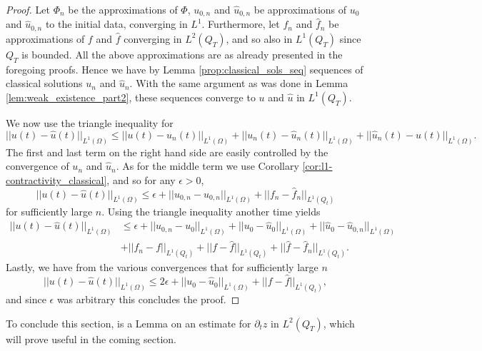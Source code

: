 \documentclass[11pt, a4paper]{article}
\begin{document}
\begin{proof}
Let $\Phi_n$ be the approximations of $\Phi$, $u_{0,n}$ and $\hat{u}_{0,n}$ be approximations of $u_0$ and $\hat{u}_{0,n}$ to the initial data, converging in $L^1$. Furthermore, let $f_n$ and $\hat{f}_n$ be approximations of $f$ and $\hat{f}$ converging in $L^2(Q_T)$, and so also in $L^1(Q_T)$ since $Q_T$ is bounded. All the above approximations are as already presented in the foregoing proofs. Hence we have by Lemma \ref{prop:classical_sols_seq} sequences of classical solutions $u_n$ and $\hat{u}_n$. With the same argument as was done in Lemma \ref{lem:weak_existence_part2}, these sequences converge to $u$ and $\hat{u}$ in $L^1(Q_T)$.

We now use the triangle inequality for
\begin{equation*}
||u(t) - \hat{u}(t)||_{L^1(\Omega)} \leq ||u(t) - u_n(t)||_{L^1(\Omega)} + ||u_n(t) - \hat{u}_n(t)||_{L^1(\Omega)} + ||\hat{u}_n(t) - \hat{u}(t)||_{L^1(\Omega)}.
\end{equation*}
The first and last term on the right hand side are easily controlled by the convergence of $u_n$ and $\hat{u}_n$. As for the middle term we use Corollary \ref{cor:l1-contractivity_classical}, and so for any $\epsilon > 0$,
\begin{equation*}
||u(t) - \hat{u}(t)||_{L^1(\Omega)} \leq \epsilon + ||u_{0,n} - \hat{u}_{0,n}||_{L^1(\Omega)} + ||f_n - \hat{f}_n||_{L^1(Q_t)}
\end{equation*}
for sufficiently large $n$.
Using the triangle inequality another time yields
\begin{align*}
||u(t) - \hat{u}(t)||_{L^1(\Omega)} &\leq \epsilon + ||u_{0,n} - u_0||_{L^1(\Omega)} + ||u_0 - \hat{u}_0||_{L^1(\Omega)} + ||\hat{u}_0 -\hat{u}_{0,n}||_{L^1(\Omega)} \\
&+ ||f_n - f||_{L^1(Q_t)} + ||f - \hat{f}||_{L^1(Q_t)} + ||\hat{f}-\hat{f}_n||_{L^1(Q_t)}.
\end{align*}
Lastly, we have from the various convergences that for sufficiently large $n$  
\begin{equation*}
||u(t) - \hat{u}(t)||_{L^1(\Omega)} \leq 2\epsilon + ||u_0 - \hat{u}_0||_{L^1(\Omega)} + ||f - \hat{f}||_{L^1(Q_t)}, 
\end{equation*}
and since $\epsilon$ was arbitrary this concludes the proof.
\end{proof}

To conclude this section, is a Lemma on an estimate for $\partial_t z$ in $L^2(Q_T)$, which will prove useful in the coming section.
\end{document}
